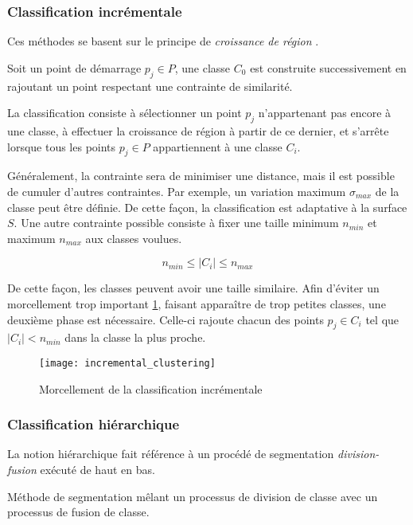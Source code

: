 \subsubsection{Classification incrémentale}
Ces méthodes se basent sur le principe de \emph{croissance de région} .

\begin{definition}
  Soit un point de démarrage $p_j \in P$, une classe $C_0$ est construite successivement en rajoutant un point respectant une contrainte de similarité.
\end{definition}

La classification consiste à sélectionner un point $p_j$ n'appartenant pas encore à une classe, à effectuer la croissance de région à partir de ce dernier, et s'arrête lorsque tous les points $p_j \in P$ appartiennent à une classe $C_i$.

Généralement, la contrainte sera de minimiser une distance, mais il est possible de cumuler d'autres contraintes. Par exemple, un variation maximum $\sigma_{max}$ de la classe peut être définie. De cette façon, la classification est adaptative à la surface $S$. Une autre contrainte possible consiste à fixer une taille minimum $n_{min}$ et maximum $n_{max}$ aux classes voulues.

$$n_{min} \le |C_i| \le n_{max}$$

De cette façon, les classes peuvent avoir une taille similaire. Afin d'éviter un morcellement trop important \ref{fig:sampling_incremental_fragmentation}, faisant apparaître de trop petites classes, une deuxième phase est nécessaire. Celle-ci rajoute chacun des points $p_j \in C_i$ tel que $|C_i| < n_{min}$ dans la classe la plus proche.

\begin{figure}
  \centering
  \texttt{[image: incremental\_clustering]}
  \caption{Morcellement de la classification incrémentale~\cite{Pauly2002}}
  \label{fig:sampling_incremental_fragmentation}
\end{figure}

\subsubsection{Classification hiérarchique}

La notion hiérarchique fait référence à un procédé de segmentation \emph{division-fusion} exécuté de haut en bas.

\begin{definition}
  Méthode de segmentation mêlant un processus de division de classe avec un processus de fusion de classe.
\end{definition}

